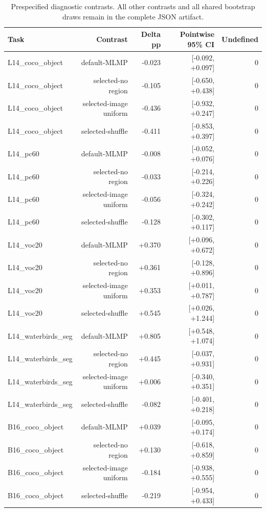 \begin{table}[htbp]
\centering\scriptsize
\caption{Prespecified diagnostic contrasts. All other contrasts and all shared bootstrap draws remain in the complete JSON artifact.}
\label{tab:diag-ci}
\setlength{\tabcolsep}{4pt}
\begin{tabular}{lrrrr}
\toprule
Task & Contrast & Delta pp & Pointwise 95\% CI & Undefined \\
\midrule
L14\_coco\_object & default-MLMP & -0.023 & [-0.092, +0.097] & 0 \\
L14\_coco\_object & selected-no region & -0.105 & [-0.650, +0.438] & 0 \\
L14\_coco\_object & selected-image uniform & -0.436 & [-0.932, +0.247] & 0 \\
L14\_coco\_object & selected-shuffle & -0.411 & [-0.853, +0.397] & 0 \\
L14\_pc60 & default-MLMP & -0.008 & [-0.052, +0.076] & 0 \\
L14\_pc60 & selected-no region & -0.033 & [-0.214, +0.226] & 0 \\
L14\_pc60 & selected-image uniform & -0.056 & [-0.324, +0.242] & 0 \\
L14\_pc60 & selected-shuffle & -0.128 & [-0.302, +0.117] & 0 \\
L14\_voc20 & default-MLMP & +0.370 & [+0.096, +0.672] & 0 \\
L14\_voc20 & selected-no region & +0.361 & [-0.128, +0.896] & 0 \\
L14\_voc20 & selected-image uniform & +0.353 & [+0.011, +0.787] & 0 \\
L14\_voc20 & selected-shuffle & +0.545 & [+0.026, +1.244] & 0 \\
L14\_waterbirds\_seg & default-MLMP & +0.805 & [+0.548, +1.074] & 0 \\
L14\_waterbirds\_seg & selected-no region & +0.445 & [-0.037, +0.931] & 0 \\
L14\_waterbirds\_seg & selected-image uniform & +0.006 & [-0.340, +0.351] & 0 \\
L14\_waterbirds\_seg & selected-shuffle & -0.082 & [-0.401, +0.218] & 0 \\
B16\_coco\_object & default-MLMP & +0.039 & [-0.095, +0.174] & 0 \\
B16\_coco\_object & selected-no region & +0.130 & [-0.618, +0.859] & 0 \\
B16\_coco\_object & selected-image uniform & -0.184 & [-0.938, +0.555] & 0 \\
B16\_coco\_object & selected-shuffle & -0.219 & [-0.954, +0.433] & 0 \\

\end{tabular}
\end{table}
